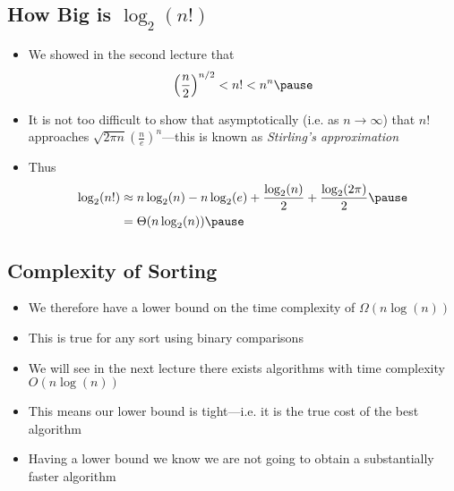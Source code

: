 
\begin{slide}
\section[-1.5]{How Big is $\log_2(n!)$}

\begin{PauseHighLight}
  \begin{itemize}\squeeze
  \item We showed in the second lecture that
    \begin{align*}
      \left( \frac{n}{2} \right)^{n/2} < n! <  n^n \pause
    \end{align*}
  \item It is not too difficult to show that asymptotically (i.e. as
    $n\rightarrow\infty$) that $n!$ approaches $\sqrt{2 \pi n}
    \left(\frac{n}{e}\right)^n$\pause---this is known as
    \emph{Stirling's approximation}\pause
  \item Thus
    \begin{align*}
      \log_2(n!) &\approx n \log_2(n) - n \log_2(e) + \frac{\log_2(n)}{2} +
      \frac{\log_2(2\pi)}{2} \pause\\
      &= \Theta(n\log_2(n))\pause
    \end{align*}
  \end{itemize}
\end{PauseHighLight}

\end{slide}


\begin{slide}
\section{Complexity of Sorting}

\begin{PauseHighLight}
  \begin{itemize}
  \item We therefore have a lower bound on the time complexity of
    $\Omega(n \log(n) )$\pause
  \item This is true for any sort using binary comparisons\pause
  \item We will see in the next lecture there exists algorithms with
    time complexity $O(n \log(n) )$\pause
  \item This means our lower bound is tight\pause---i.e. it is
    the true cost of the best algorithm\pause
  \item Having a lower bound we know we are not going to obtain a
    substantially faster algorithm\pause
  \end{itemize}
\end{PauseHighLight}

\end{slide}

